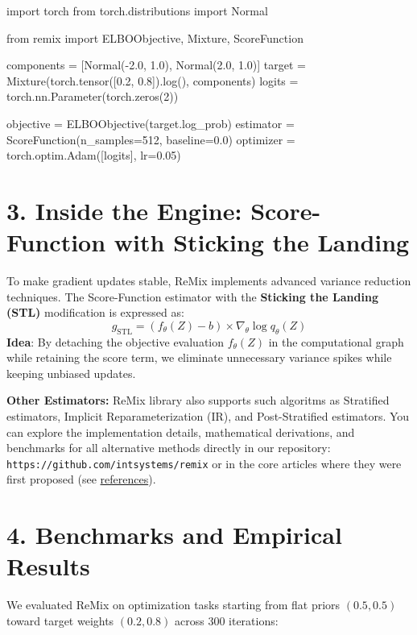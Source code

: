 \documentclass[11pt, a4paper]{article}
\begin{document}
\begin{codeblock}
import torch
from torch.distributions import Normal

from remix import ELBOObjective, Mixture, ScoreFunction

components = [Normal(-2.0, 1.0), Normal(2.0, 1.0)]
target = Mixture(torch.tensor([0.2, 0.8]).log(), components)
logits = torch.nn.Parameter(torch.zeros(2))

objective = ELBOObjective(target.log_prob)
estimator = ScoreFunction(n_samples=512, baseline=0.0)
optimizer = torch.optim.Adam([logits], lr=0.05)
\end{codeblock}


\section*{3. Inside the Engine: Score-Function with Sticking the Landing}
To make gradient updates stable, ReMix implements advanced variance reduction techniques. The Score-Function estimator with the \textbf{Sticking the Landing (STL)} modification is expressed as:
\[
g_{\text{STL}} = (f_{\theta}(Z) - b) \times \nabla_{\theta} \log q_{\theta}(Z)
\]
\textbf{Idea}: By detaching the objective evaluation $f_{\theta}(Z)$ in the computational graph while retaining the score term, we eliminate unnecessary variance spikes while keeping unbiased updates.

\noindent\textbf{Other Estimators:} ReMix library also supports such algoritms as Stratified estimators, Implicit Reparameterization (IR), and Post-Stratified estimators. You can explore the implementation details, mathematical derivations, and benchmarks for all alternative methods directly in our repository:  \\
\texttt{https://github.com/intsystems/remix} or in the core articles where they were first proposed (see \hyperlink{sec:references}{references}).

\section*{4. Benchmarks and Empirical Results}
We evaluated ReMix on optimization tasks starting from flat priors $(0.5, 0.5)$ toward target weights $(0.2, 0.8)$ across 300 iterations:
\end{document}

